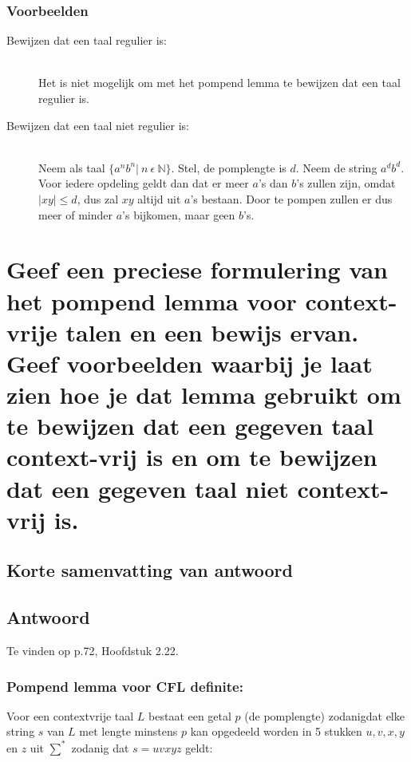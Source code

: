 \documentclass{article}
\begin{document}
        \subsubsection{Voorbeelden}
            \begin{description}
                \item[Bewijzen dat een taal regulier is:] \hfill  \\
                        Het is niet mogelijk om met het pompend lemma te bewijzen dat een taal regulier is.

                \item[Bewijzen dat een taal niet regulier is:] \hfill \\
                        Neem als taal $\{a^nb^n \vert\  n\ \epsilon\ \mathbb{N} \}$. Stel, de pomplengte is $d$. Neem de string $a^db^d$. Voor iedere opdeling geldt dan dat er meer $a$'s dan $b$'s zullen zijn, omdat $\vert xy \vert \leq d$, dus zal $xy$ altijd uit $a$'s bestaan. Door te pompen zullen er dus meer of minder $a$'s bijkomen, maar geen $b$'s.
            \end{description}

\newpage
\section{Geef een preciese formulering van het pompend lemma voor context-vrije talen en een bewijs ervan. Geef voorbeelden waarbij je laat zien hoe je dat lemma gebruikt om te bewijzen dat een gegeven taal context-vrij is en om te bewijzen dat een gegeven taal niet context-vrij is.}
    \subsection{Korte samenvatting van antwoord}

    \subsection{Antwoord}
        Te vinden op p.72, Hoofdstuk 2.22.
        \subsubsection{Pompend lemma voor CFL definite:}
            Voor een contextvrije taal $L$ bestaat een getal $p$ (de pomplengte) zodanigdat elke string $s$ van $L$ met lengte minstens $p$ kan opgedeeld worden in 5 stukken $u,v,x,y$ en $z$ uit $\sum^*$ zodanig dat $s = uvxyz$ geldt:
\end{document}
